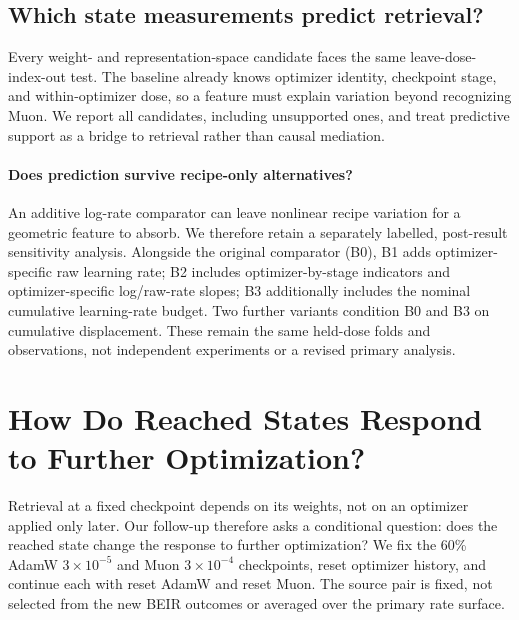 \documentclass[11pt]{article}
\begin{document}
\DimensionUtilizationFinding

\DimensionUtilizationFigure

\subsection{Which state measurements predict retrieval?}

Every weight- and representation-space candidate faces the same leave-dose-index-out test. The
baseline already knows optimizer identity, checkpoint stage, and within-optimizer dose, so a feature
must explain variation beyond recognizing Muon. We report all candidates, including unsupported
ones, and treat predictive support as a bridge to retrieval rather than causal mediation.

\CorrectedGeometryBridgeFinding

\DimensionRetrievalBridgeFinding

\paragraph{Does prediction survive recipe-only alternatives?}
An additive log-rate comparator can leave nonlinear recipe variation for a geometric feature
to absorb. We therefore retain a separately labelled, post-result sensitivity analysis. Alongside
the original comparator (B0), B1 adds optimizer-specific raw learning rate; B2 includes
optimizer-by-stage indicators and optimizer-specific log/raw-rate slopes; B3 additionally
includes the nominal cumulative learning-rate budget. Two further variants condition B0 and
B3 on cumulative displacement. These remain the same held-dose folds and observations,
not independent experiments or a revised primary analysis.
\RecipeSensitivityFinding

\section{How Do Reached States Respond to Further Optimization?}

Retrieval at a fixed checkpoint depends on its weights, not on an optimizer applied only later.
Our follow-up therefore asks a conditional question: does the reached state change the response to
further optimization? We fix the 60\% AdamW $3\!\times\!10^{-5}$ and Muon $3\!\times\!10^{-4}$
checkpoints, reset optimizer history, and continue each with reset AdamW and reset Muon. The source
pair is fixed, not selected from the new BEIR outcomes or averaged over the primary rate surface.
\end{document}
